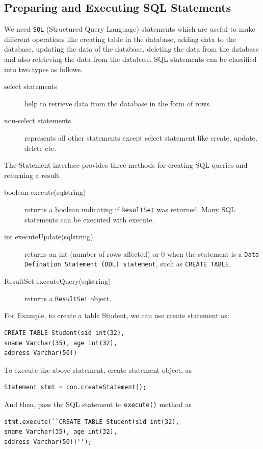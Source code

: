 \documentclass[11pt,a4paper]{article}
\begin{document}
\subsection*{Preparing and Executing SQL Statements}
We need \texttt{SQL} (Structured Query Language) statements which are useful to make different operations like creating table in the database, adding data to the database, updating the data of the database, deleting the data from the database and also retrieving the data from the database. SQL statements can be classified into two types as follows.
\begin{description}
    \item[select statements] help to retrieve data from the database in the form of rows.
    \item[non-select statements] represents all other statements except select statement like create, update, delete etc.
\end{description}

The Statement interface provides three methods for creating SQL queries and returning a result.
\begin{description}
\item[boolean execute(sqlstring)] returns a boolean indicating if \texttt{ResultSet} was returned. Many SQL statements can be executed with execute.
\item[int executeUpdate(sqlstring)] returns an int (number of rows affected) or 0 when the statement is a \texttt{Data Defination Statement (DDL) statement}, such as \texttt{CREATE TABLE}.
\item[ResultSet executeQuery(sqlstring)] returns a \texttt{ResultSet} object.
\end{description}
For Example, to create a table Student, we can use create statement as:
\begin{lstlisting}[numbers=none]
CREATE TABLE Student(sid int(32), 
sname Varchar(35), age int(32), 
address Varchar(50))
\end{lstlisting}
To execute the above statement, create statement object, as
\begin{lstlisting}[numbers=none]
Statement stmt = con.createStatement();
\end{lstlisting}
And then, pass the SQL statement to \texttt{execute()} method as
\begin{lstlisting}[numbers=none]
stmt.execute(``CREATE TABLE Student(sid int(32),
sname Varchar(35), age int(32), 
address Varchar(50))'');
 \end{lstlisting}
\end{document}
